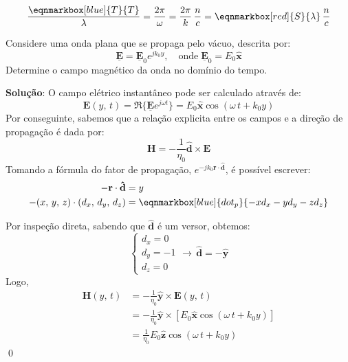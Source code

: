 \vspace{0.5em}
\begin{equation}
    \frac{\eqnmarkbox[blue]{T}{T}}{\lambda} = \frac{2\pi}{\omega} = \frac{2\pi}{k}\,\frac{n}{c} = \eqnmarkbox[red]{S}{\lambda}\, \frac{n}{c}
\end{equation}


\clearpage
\begin{question}
    Considere uma onda plana que se propaga pelo vácuo, descrita por:
    \begin{equation*}
        \mathbf{\underline{E}} = \mathbf{\underline{E}}_0 e^{j k_0 y}, \quad \text{onde}\; \mathbf{\underline{E}}_0 = E_0 \mathbf{\hat{x}}
    \end{equation*}
    Determine o campo magnético da onda no domínio do tempo.
    
    \questionSep
    \textbf{Solução}: O campo elétrico instantâneo pode ser calculado através de:
    $$
        \mathbf{E}(y,\,t) = \Re\{\mathbf{\underline{E}} e^{j\omega t}\} = E_0\mathbf{\hat{x}}\cos(\omega\,t + k_0 y)
    $$
    Por conseguinte, sabemos que a relação explicita entre os campos e a direção de propagação é dada por:
    $$
        \mathbf{H} = -\frac{1}{\eta_0}\mathbf{\hat{d}} \times \mathbf{E}
    $$
    Tomando a fórmula do fator de propagação, $e^{-jk_0\mathbf{r}\cdot \mathbf{\hat{d}}}$, é possível escrever:
    $$
        \begin{aligned}
               -\mathbf{r}\cdot\mathbf{\hat{d}} &= y\\
               -(x,\,y,\,z)\cdot (d_x,\,d_y,\,d_z) &= \eqnmarkbox[blue]{dot_p}{-xd_x - yd_y - zd_z}\\
        \end{aligned}
    $$
    
    \vspace{-1.25em}
    Por inspeção direta, sabendo que $\mathbf{\hat{d}}$ é um versor, obtemos:
    $$
        \begin{cases}%
            d_x = 0\\
            d_y = -1\\
            d_z = 0
        \end{cases}\rightarrow\,
        \boxed{\mathbf{\hat{d}} = -\mathbf{\hat{y}}}
    $$
    Logo,
    $$
        \begin{aligned}
                \mathbf{H}(y,\,t) &= -\frac{1}{\eta_0}\mathbf{\hat{y}} \times \mathbf{E}(y,\,t)\\
                &= -\frac{1}{\eta_0}\mathbf{\hat{y}} \times \left[ E_0\mathbf{\hat{x}}\cos(\omega\,t + k_0 y) \right]\\
                &= \boxed{\frac{1}{\eta_0}E_0\mathbf{\hat{z}}\cos(\omega\,t + k_0 y)} 
        \end{aligned}
    $$
    \qed
\end{question}


